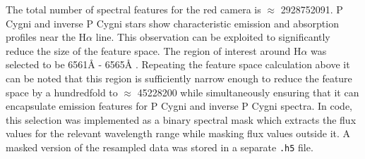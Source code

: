 The total number of spectral features for the red camera is $\approx$ \num[round-precision=2,round-mode=figures, scientific-notation=true]{2928752091}. P Cygni and inverse P Cygni stars show characteristic emission and absorption profiles near the H$\alpha$ line. This observation can be exploited to significantly reduce the size of the feature space. 
The region of interest around H$\alpha$ was selected to be 6561\r{A} - 6565\r{A} \cite{traven2017galah}. Repeating the feature space calculation above it can be noted that this region is sufficiently narrow enough to reduce the feature space by a hundredfold to $\approx$ \num[round-precision=2,round-mode=figures, scientific-notation=true]{45228200} while simultaneously ensuring that it can encapsulate emission features for P Cygni and inverse P Cygni spectra. In code, this selection was implemented as a binary spectral mask which extracts the flux values for the relevant wavelength range while masking flux values outside it. A masked version of the resampled data was stored in a separate \texttt{.h5} file.

